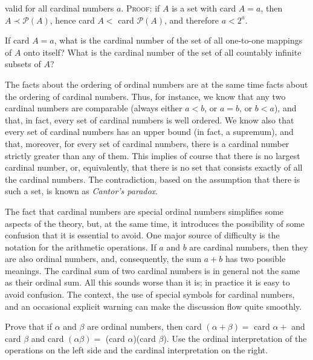 valid for all cardinal numbers $a$. \textsc{Proof}: if $A$ is a set with card $A = a$, then $A \prec \mathcal{P}(A)$, hence card $A <$ card $\mathcal{P}(A)$, and therefore $a < 2^{a}$. 

\begin{exercise} If card $A = a$, what is the cardinal number of the set of all one-to-one mappings of $A$ onto itself? What is the cardinal number of the set of all countably infinite subsets of $A$?
\end{exercise}

The facts about the ordering of ordinal numbers are at the same time facts about the ordering of cardinal numbers. Thus, for instance, we know that any two cardinal numbers are comparable (always either $a < b$, or $a = b$, or $b < a$), and that, in fact, every set of cardinal numbers is well ordered. We know also that every set of cardinal numbers has an upper bound (in fact, a supremum), and that, moreover, for every set of cardinal numbers, there is a cardinal number strictly greater than any of them. This implies of course that there is no largest cardinal number, or, equivalently, that there is no set that consists exactly of all the cardinal numbers. The contradiction, based on the assumption that there is such a set, is known as \textit{Cantor's paradox}. 

The fact that cardinal numbers are special ordinal numbers simplifies some aspects of the theory, but, at the same time, it introduces the possibility of some confusion that it is essential to avoid. One major source of difficulty is the notation for the arithmetic operations. If $a$ and $b$ are cardinal numbers, then they are also ordinal numbers, and, consequently, the sum $a + b$ has two possible meanings. The cardinal sum of two cardinal numbers is in general not the same as their ordinal sum. All this sounds worse than it is; in practice it is easy to avoid confusion. The context, the use of special symbols for cardinal numbers, and an occasional explicit warning can make the discussion flow quite smoothly. 

\begin{exercise} Prove that if $\alpha$ and $\beta$ are ordinal numbers, then card $(\alpha + \beta ) =$ card $\alpha +$ and card $\beta$ and card $(\alpha \beta) =$ (card $\alpha$)(card $\beta$). Use the ordinal interpretation of the operations on the left side and the cardinal interpretation on the right. 
\end{exercise}

